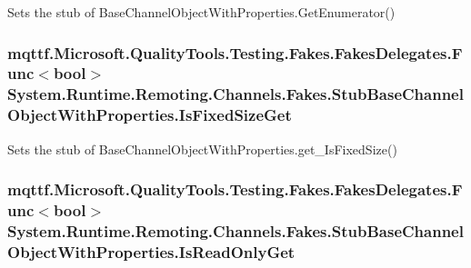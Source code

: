 Sets the stub of Base\-Channel\-Object\-With\-Properties.\-Get\-Enumerator()

\hypertarget{class_system_1_1_runtime_1_1_remoting_1_1_channels_1_1_fakes_1_1_stub_base_channel_object_with_properties_a977486e165fa032d4fbdd18bc7284057}{
\subsubsection[{Is\-Fixed\-Size\-Get}]{\setlength{\rightskip}{0pt plus 5cm}mqttf.\-Microsoft.\-Quality\-Tools.\-Testing.\-Fakes.\-Fakes\-Delegates.\-Func$<$bool$>$ System.\-Runtime.\-Remoting.\-Channels.\-Fakes.\-Stub\-Base\-Channel\-Object\-With\-Properties.\-Is\-Fixed\-Size\-Get}}\label{class_system_1_1_runtime_1_1_remoting_1_1_channels_1_1_fakes_1_1_stub_base_channel_object_with_properties_a977486e165fa032d4fbdd18bc7284057}


Sets the stub of Base\-Channel\-Object\-With\-Properties.\-get\-\_\-\-Is\-Fixed\-Size()

\hypertarget{class_system_1_1_runtime_1_1_remoting_1_1_channels_1_1_fakes_1_1_stub_base_channel_object_with_properties_aa9e0bfb23b819f16c85a9f6db28069ea}{
\subsubsection[{Is\-Read\-Only\-Get}]{\setlength{\rightskip}{0pt plus 5cm}mqttf.\-Microsoft.\-Quality\-Tools.\-Testing.\-Fakes.\-Fakes\-Delegates.\-Func$<$bool$>$ System.\-Runtime.\-Remoting.\-Channels.\-Fakes.\-Stub\-Base\-Channel\-Object\-With\-Properties.\-Is\-Read\-Only\-Get}}\label{class_system_1_1_runtime_1_1_remoting_1_1_channels_1_1_fakes_1_1_stub_base_channel_object_with_properties_aa9e0bfb23b819f16c85a9f6db28069ea}


